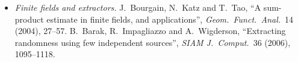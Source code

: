 \begin{itemize}
\item \emph{Finite fields and extractors.} J.~Bourgain, N.~Katz and T.~Tao, ``A sum-product estimate in finite fields, and applications'', \emph{Geom.\ Funct.\ Anal.}\ 14 (2004), 27--57. B.~Barak, R.~Impagliazzo and A.~Wigderson, ``Extracting randomness using few independent sources'', \emph{SIAM J.\ Comput.}\ 36 (2006), 1095--1118.
\end{itemize}
